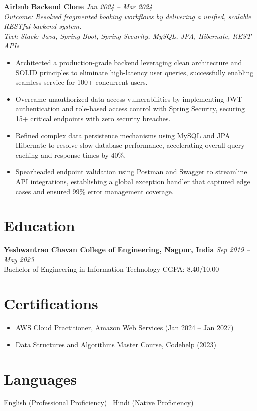 \documentclass[10pt, letterpaper]{article}
\begin{document}
\textbf{Airbnb Backend Clone} \hfill \textit{Jan 2024 -- Mar 2024} \\
\textit{Outcome: Resolved fragmented booking workflows by delivering a unified, scalable RESTful backend system.} \\
\textit{Tech Stack: Java, Spring Boot, Spring Security, MySQL, JPA, Hibernate, REST APIs}
\begin{itemize}[leftmargin=0.2in, itemsep=1pt, parsep=0pt, topsep=2pt]
    \item Architected a production-grade backend leveraging clean architecture and SOLID principles to eliminate high-latency user queries, successfully enabling seamless service for 100+ concurrent users.
    \item Overcame unauthorized data access vulnerabilities by implementing JWT authentication and role-based access control with Spring Security, securing 15+ critical endpoints with zero security breaches.
    \item Refined complex data persistence mechanisms using MySQL and JPA Hibernate to resolve slow database performance, accelerating overall query caching and response times by 40\%.
    \item Spearheaded endpoint validation using Postman and Swagger to streamline API integrations, establishing a global exception handler that captured edge cases and ensured 99\% error management coverage.
\end{itemize}

\section{Education}
\textbf{Yeshwantrao Chavan College of Engineering, Nagpur, India} \hfill \textit{Sep 2019 -- May 2023} \\
Bachelor of Engineering in Information Technology \hfill CGPA: 8.40/10.00

\section{Certifications}
\begin{itemize}[leftmargin=0.2in, itemsep=1pt, parsep=0pt, topsep=2pt]
    \item AWS Cloud Practitioner, Amazon Web Services (Jan 2024 -- Jan 2027)
    \item Data Structures and Algorithms Master Course, Codehelp (2023)
\end{itemize}

\section{Languages}
English (Professional Proficiency) \textbar\ Hindi (Native Proficiency)
\end{document}
